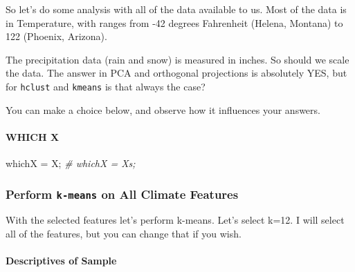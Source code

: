 \documentclass[
]{article}
\newenvironment{Shaded}{\begin{snugshade}}{\end{snugshade}}
\newcommand{\CommentTok}[1]{\textcolor[rgb]{0.56,0.35,0.01}{\textit{#1}}}
\newcommand{\DecValTok}[1]{\textcolor[rgb]{0.00,0.00,0.81}{#1}}
\newcommand{\KeywordTok}[1]{\textcolor[rgb]{0.13,0.29,0.53}{\textbf{#1}}}
\newcommand{\NormalTok}[1]{#1}
\newcommand{\OperatorTok}[1]{\textcolor[rgb]{0.81,0.36,0.00}{\textbf{#1}}}
\newcommand{\StringTok}[1]{\textcolor[rgb]{0.31,0.60,0.02}{#1}}
\begin{document}
\begin{Shaded}
\end{Shaded}

So let's do some analysis with all of the data available to us. Most of
the data is in Temperature, with ranges from -42 degrees Fahrenheit
(Helena, Montana) to 122 (Phoenix, Arizona).

The precipitation data (rain and snow) is measured in inches. So should
we scale the data. The answer in PCA and orthogonal projections is
absolutely YES, but for \texttt{hclust} and \texttt{kmeans} is that
always the case?

You can make a choice below, and observe how it influences your answers.

\hypertarget{which-x}{%
\paragraph{WHICH X}\label{which-x}}

\begin{Shaded}
\begin{Highlighting}[]
\NormalTok{whichX =}\StringTok{ }\NormalTok{X;}
\CommentTok{\# whichX = Xs;}
\end{Highlighting}
\end{Shaded}

\hypertarget{perform-k-means-on-all-climate-features}{%
\subsubsection{\texorpdfstring{Perform \texttt{k-means} on All Climate
Features}{Perform k-means on All Climate Features}}\label{perform-k-means-on-all-climate-features}}

With the selected features let's perform k-means. Let's select k=12. I
will select all of the features, but you can change that if you wish.

\hypertarget{descriptives-of-sample}{%
\paragraph{Descriptives of Sample}\label{descriptives-of-sample}}
\end{document}
